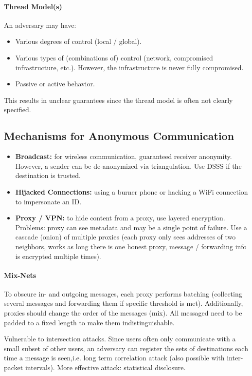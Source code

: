 \paragraph{Thread Model(s)}
An adversary may have:
\begin{itemize}
    \item Various degrees of control (local / global).
    \item Various types of (combinations of) control (network, compromised infrastructure, etc.). However, the infrastructure is never fully compromised.
    \item Passive or active behavior.
\end{itemize}
This results in unclear guarantees since the thread model is often not clearly specified.

\subsection{Mechanisms for Anonymous Communication}

\begin{itemize}
    \item \textbf{Broadcast:} for wireless communication, guaranteed receiver anonymity. However, a sender can be de-anonymized via triangulation. Use DSSS if the destination is trusted.
    \item \textbf{Hijacked Connections:} using a burner phone or hacking a WiFi connection to impersonate an ID.
    \item \textbf{Proxy / VPN:} to hide content from a proxy, use layered encryption. Problems: proxy can see metadata and may be a single point of failure. Use a cascade (onion) of multiple proxies (each proxy only sees addresses of two neighbors, works as long there is one honest proxy, message / forwarding info is encrypted multiple times).
\end{itemize}

\paragraph{Mix-Nets}
To obscure in- and outgoing messages, each proxy performs batching (collecting several messages and forwarding them if specific threshold is met). Additionally, proxies should change the order of the messages (mix). All messaged need to be padded to a fixed length to make them indistinguishable.

Vulnerable to intersection attacks. Since users often only communicate with a small subset of other users, an adversary can register the sets of destinations each time a message is seen,i.e. long term correlation attack (also possible with inter-packet intervals). More effective attack: statistical disclosure.

